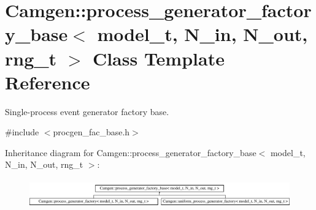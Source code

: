 \hypertarget{a00438}{}\section{Camgen\+:\+:process\+\_\+generator\+\_\+factory\+\_\+base$<$ model\+\_\+t, N\+\_\+in, N\+\_\+out, rng\+\_\+t $>$ Class Template Reference}
\label{a00438}


Single-\/process event generator factory base.  




{\ttfamily \#include $<$procgen\+\_\+fac\+\_\+base.\+h$>$}

Inheritance diagram for Camgen\+:\+:process\+\_\+generator\+\_\+factory\+\_\+base$<$ model\+\_\+t, N\+\_\+in, N\+\_\+out, rng\+\_\+t $>$\+:\begin{figure}[H]
\begin{center}
\leavevmode
\includegraphics[height=1.225383cm]{a00438}
\end{center}
\end{figure}
